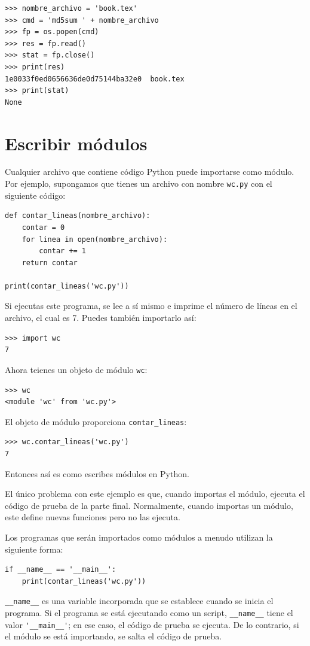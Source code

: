 \documentclass[10pt]{book}
\begin{document}
\begin{verbatim}
>>> nombre_archivo = 'book.tex'
>>> cmd = 'md5sum ' + nombre_archivo
>>> fp = os.popen(cmd)
>>> res = fp.read()
>>> stat = fp.close()
>>> print(res)
1e0033f0ed0656636de0d75144ba32e0  book.tex
>>> print(stat)
None
\end{verbatim}



\section{Escribir módulos}
\label{modules}

Cualquier archivo que contiene código Python puede importarse como módulo.
Por ejemplo, supongamos que tienes un archivo con nombre {\tt wc.py} con el siguiente
código:

\begin{verbatim}
def contar_lineas(nombre_archivo):
    contar = 0
    for linea in open(nombre_archivo):
        contar += 1
    return contar

print(contar_lineas('wc.py'))
\end{verbatim}
%
Si ejecutas este programa, se lee a sí mismo e imprime el número
de líneas en el archivo, el cual es 7.
Puedes también importarlo así:

\begin{verbatim}
>>> import wc
7
\end{verbatim}
%
Ahora teienes un objeto de módulo {\tt wc}:

\begin{verbatim}
>>> wc
<module 'wc' from 'wc.py'>
\end{verbatim}
%
El objeto de módulo proporciona \verb"contar_lineas":

\begin{verbatim}
>>> wc.contar_lineas('wc.py')
7
\end{verbatim}
%
Entonces así es como escribes módulos en Python.

El único problema con este ejemplo es que, cuando importas
el módulo, ejecuta el código de prueba de la parte final.  Normalmente,
cuando importas un módulo, este define nuevas funciones pero
no las ejecuta.

Los programas que serán importados como módulos a menudo
utilizan la siguiente forma:

\begin{verbatim}
if __name__ == '__main__':
    print(contar_lineas('wc.py'))
\end{verbatim}
%
\verb"__name__" es una variable incorporada que se establece cuando
se inicia el programa.  Si el programa se está ejecutando como un script,
\verb"__name__" tiene el valor \verb"'__main__'"; en ese
caso, el código de prueba se ejecuta.  De lo contrario,
si el módulo se está importando, se salta el código de prueba.
\end{document}
